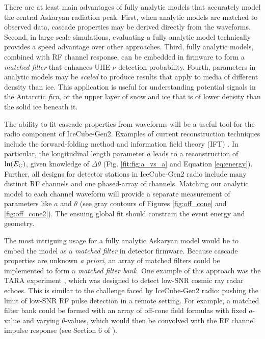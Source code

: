 \documentclass[amsmath,amssymb,aps,prd,10pt,twocolumn]{revtex4}
\begin{document}
There are at least main advantages of fully analytic models that accurately model the central Askaryan radiation peak.  First, when analytic models are matched to observed data, cascade properties may be derived directly from the waveforms.  Second, in large scale simulations, evaluating a fully analytic model technically provides a speed advantage over other approaches.  Third, fully analytic models, combined with RF channel response, can be embedded in firmware to form a \textit{matched filter} that enhances UHE-$\nu$ detection probability.  Fourth, parameters in analytic models may be \textit{scaled} to produce results that apply to media of different density than ice.  This application is useful for understanding potential signals in the Antarctic \textit{firn}, or the upper layer of snow and ice that is of lower density than the solid ice beneath it.

The ability to fit cascade properties from waveforms will be a useful tool for the radio component of IceCube-Gen2.  Examples of current reconstruction techniques include the forward-folding method \cite{10.1088/1748-0221/15/09/p09039} and information field theory (IFT) \cite{IFT}.  In particular, the longitudinal length parameter $a$ leads to a reconstruction of $\ln(E_{\rm C})$, given knowledge of $\Delta \theta$ (Fig. \ref{fit:fig:a_vs_a} and Equation \ref{eq:energy}).  Further, all designs for detector stations in IceCube-Gen2 radio include many distinct RF channels and one phased-array of channels.  Matching our analytic model to each channel waveform will provide a separate measurement of parameters like $a$ and $\theta$ (see gray contours of Figures \ref{fig:off_cone} and \ref{fig:off_cone2}).  The ensuing global fit should constrain the event energy and geometry.

The most intriguing usage for a fully analytic Askaryan model would be to embed the model as a \textit{matched filter} in detector firmware.  Because cascade properties are unknown \textit{a priori}, an array of matched filters could be implemented to form a \textit{matched filter bank.}  One example of this approach was the TARA experiment \cite{ABBASI20171}, which was designed to detect low-SNR cosmic ray radar echoes.  This is similar to the challenge faced by IceCube-Gen2 radio: pushing the limit of low-SNR RF pulse detection in a remote setting.  For example, a matched filter bank could be formed with an array of off-cone field formulas with fixed $a$-value and varying $\theta$-values, which would then be convolved with the RF channel impulse response (see Section 6 of \cite{10.1016/j.astropartphys.2014.09.002}).
\end{document}
